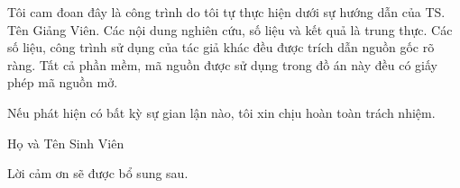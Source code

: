 


\thesislayout


\coverpage

\frontmatter

\begin{declaration}
Tôi cam đoan đây là công trình do tôi tự thực hiện dưới sự hướng dẫn của TS. Tên Giảng Viên. Các nội dung nghiên cứu, số liệu và kết quả là trung thực. Các số liệu, công trình sử dụng của tác giả khác đều được trích dẫn nguồn gốc rõ ràng. Tất cả phần mềm, mã nguồn được sử dụng trong đồ án này đều có giấy phép mã nguồn mở.

Nếu phát hiện có bất kỳ sự gian lận nào, tôi xin chịu hoàn toàn trách nhiệm.

\begin{flushright}
{Họ và Tên Sinh Viên}
\end{flushright}
\end{declaration}

\newpage

\begin{acknowledgments}
Lời cảm ơn sẽ được bổ sung sau.
\end{acknowledgments}

\begin{abstract}
Đồ án nghiên cứu và triển khai hệ thống Zero Trust Software Supply Chain cho Kubernetes theo chuẩn SLSA Level 3, nhằm đảm bảo an toàn cho quy trình build và triển khai container image. Hệ thống bao gồm pipeline CI/CD tự động tạo provenance và ký số container image, quản lý SBOM, và Kubernetes Admission Controller kiểm soát việc triển khai container theo mô hình Zero Trust. Kết quả thực nghiệm cho thấy hệ thống có khả năng ngăn chặn hiệu quả các kịch bản tấn công giả mạo và chèn mã độc trong chuỗi cung ứng phần mềm.

\textbf{Từ khóa:} Zero Trust, Software Supply Chain, SLSA, Kubernetes, Container Security, Sigstore, Provenance, SBOM.
\end{abstract}

\tableofcontents
\listoftables
\listoffigures

\mainmatter
\fancyhead{}
\renewcommand{\footrulewidth}{0.4pt}
\pagestyle{fancy} 
\renewcommand{\chaptermark}[1]{\markboth{#1}{#1}}
\fancyhead[R]{\chaptername\ \thechapter\ --\ \leftmark}







 



